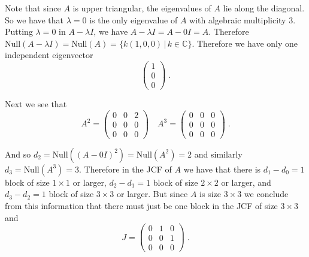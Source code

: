 \documentclass[11pt]{article}
\begin{document}
Note that since $A$ is upper triangular, the eigenvalues of $A$ lie along the diagonal. So we have that $\lambda = 0$ is the only eigenvalue of $A$ with algebraic multiplicity 3. Putting $\lambda = 0$ in $A - \lambda I$, we have $A - \lambda I = A - 0I = A$. Therefore $\text{Null}(A-\lambda I) = \text{Null}(A) = \{k (1, 0, 0) \,| \, k \in \mathbb{C}\}$.  Therefore we have only one independent eigenvector $$ \begin{pmatrix}
1\\0\\0
\end{pmatrix} \;.$$

Next we see that $$A^2 = \begin{pmatrix}
0 & 0 & 2 \\ 0 &0 &0 \\ 0& 0 & 0
\end{pmatrix} \quad A^3 =  \begin{pmatrix}
0 & 0 & 0 \\ 0 &0 &0 \\ 0& 0 & 0
\end{pmatrix} \;.$$

And so $d_2 = \text{Null}((A-0I)^2)= \text{Null}(A^2) = 2$ and similarly $ d_3 = \text{Null}(A^3) = 3$. Therefore in the JCF of $A$ we have that there is $d_1 - d_0 = 1$ block of size $1 \times 1$ or larger, $d_2 - d_1 = 1$ block of size $2 \times 2$ or larger, and $d_3 - d_2 = 1$ block of size $3 \times 3$ or larger. But since $A$ is size $3 \times 3$ we conclude from this information that there must just be one block in the JCF of size $3 \times 3$ and 
$$ J = \begin{pmatrix}
0&1&0\\0&0&1\\0&0&0
\end{pmatrix} \;.$$ 

\section{}
\end{document}

